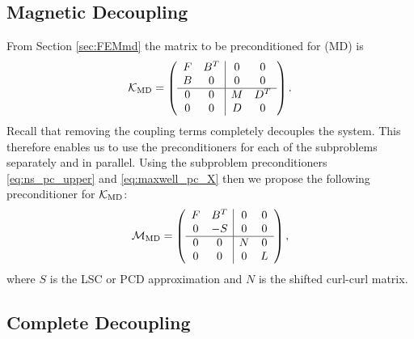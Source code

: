 \subsection{Magnetic Decoupling}
\label{sec:MDprecond}

From Section \ref{sec:FEMmd} the  matrix to be preconditioned for (MD) is
\begin{equation}
\label{eq:Kmd}
   \mathcal{K}_{\rm MD} =
    \left(
    \begin{array}{cc|cc}
    F& B^T & 0 & 0\\
    B & 0 & 0 & 0 \\
    \hline
    0 & 0 & M & D^T\\
    0 & 0 & D & 0
    \end{array}
    \right).
\end{equation}
Recall that removing the coupling terms completely decouples the system. This therefore enables us to use the preconditioners for each of the subproblems separately and in parallel. Using the subproblem preconditioners \eqref{eq:ns_pc_upper} and \eqref{eq:maxwell_pc_X} then we propose the following preconditioner for $\mathcal{K}_{\rm MD}$:
\begin{equation}
\label{eq:mhd_pc_explicit}
\mathcal{M}_{\rm MD} =
\left(
\begin{array}{cc|cc}
F & B^T & 0 & 0\\
0 & -{S} & 0 & 0 \\
\hline
0 & 0 & N & 0\\
0 & 0 & 0 & L
\end{array}
\right),
\end{equation}
where $S$ is the LSC or PCD approximation and $N$ is the shifted curl-curl matrix.

\subsection{Complete Decoupling}
\label{sec:CDprecond}

